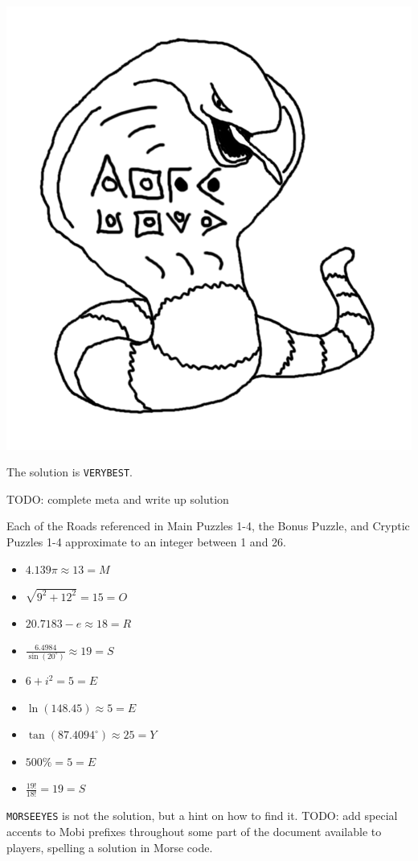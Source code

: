 \begin{center}
\includegraphics[width=0.2\linewidth]{assets/not-arbok-solution.png}
\end{center}

The solution is \texttt{VERYBEST}.


TODO: complete meta and write up solution


Each of the Roads referenced in Main Puzzles 1-4, the Bonus Puzzle,
and Cryptic Puzzles 1-4 approximate to an integer between 1 and 26.

\begin{multicols}{3}
\begin{itemize}
  \item \(4.139\pi\approx13=M\)
  \item \(\sqrt{9^2+12^2}=15=O\)
  \item \(20.7183-e\approx18=R\)
  \item \(\frac{6.4984}{\sin(20^\circ)}\approx19=S\)
  \item \(6+i^2=5=E\)
  \item \(\ln(148.45)\approx5=E\)
  \item \(\tan(87.4094^\circ)\approx25=Y\)
  \item \(500\%=5=E\)
  \item \(\frac{19!}{18!}=19=S\)
\end{itemize}
\end{multicols}

\texttt{MORSEEYES} is not the solution, but a hint on how to find it.
TODO: add special accents to Mobi prefixes throughout some part of the
document available to players, spelling a solution in Morse code.

